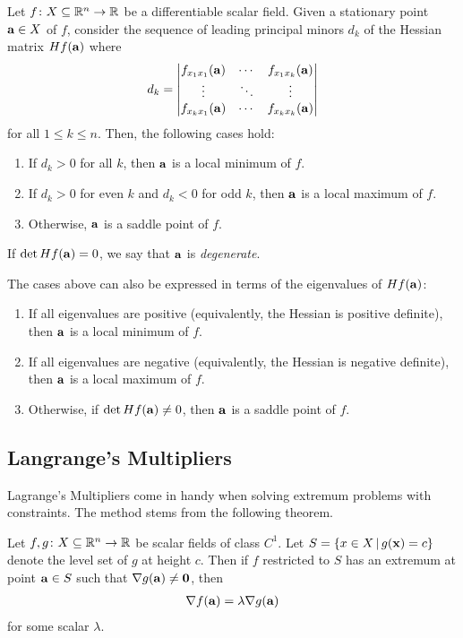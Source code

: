 \documentclass{article}
\begin{document}
\begin{theorem}
  Let $f \colon X \subseteq \mathbb{R}^n \to \mathbb{R}$ be a differentiable scalar field.
  Given a stationary point $\mathbf{a} \in X$ of $f$, consider the sequence of leading principal minors $d_k$ of the Hessian matrix $Hf(\mathbf{a})$ where
  \begin{align}
    d_k = \begin{vmatrix} f_{x_1 x_1}(\mathbf{a}) & \cdots & f_{x_1 x_k}(\mathbf{a})
                \\
                \vdots                & \ddots & \vdots
                \\
                f_{x_k x_1}(\mathbf{a}) & \cdots & f_{x_k x_k}(\mathbf{a})
          \end{vmatrix}
  \end{align}
  for all $1 \leq k \leq n$.
  Then, the following cases hold:
  \begin{enumerate}
    \item If $d_k > 0$ for all $k$, then $\mathbf{a}$ is a local minimum of $f$.
    \item If $d_k > 0$ for even $k$ and $d_k < 0$ for odd $k$, then $\mathbf{a}$ is a local maximum of $f$.
    \item Otherwise, $\mathbf{a}$ is a saddle point of $f$.
  \end{enumerate}
  If $\det Hf(\mathbf{a}) = 0$, we say that $\mathbf{a}$ is \emph{degenerate}.
\end{theorem}
The cases above can also be expressed in terms of the eigenvalues of $Hf(\mathbf{a})$:
\begin{enumerate}
  \item If all eigenvalues are positive (equivalently, the Hessian is positive definite), then $\mathbf{a}$ is a local minimum of $f$.
  \item If all eigenvalues are negative (equivalently, the Hessian is negative definite), then $\mathbf{a}$ is a local maximum of $f$.
  \item Otherwise, if $\det Hf(\mathbf{a}) \neq 0$, then $\mathbf{a}$ is a saddle point of $f$.
\end{enumerate}

\subsection{Langrange's Multipliers}

Lagrange's Multipliers come in handy when solving extremum problems with constraints.
The method stems from the following theorem.

\begin{theorem}
  Let $f, g \colon X \subseteq \mathbb{R}^n \to \mathbb{R}$ be scalar fields of class $C^1$.
  Let $S = \{x \in X \,|\, g(\mathbf{x}) = c\}$ denote the level set of $g$ at height $c$.
  Then if $f$ restricted to $S$ has an extremum at point $\mathbf{a} \in S$ such that $\nabla g(\mathbf{a}) \neq \mathbf{0}$, then
  \begin{align}
    \nabla f(\mathbf{a}) = \lambda \nabla g(\mathbf{a})
  \end{align}
  for some scalar $\lambda$.
\end{theorem}
\end{document}
